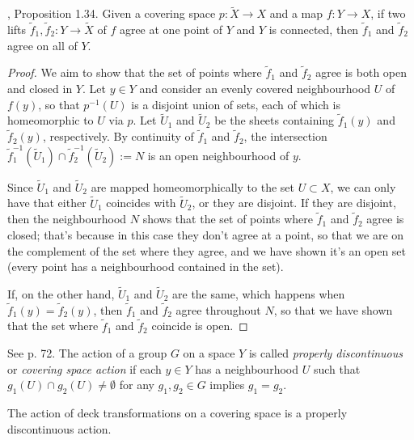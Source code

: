 \begin{proposition}
\label{proposition-unique-lifting-property}
\cite{hat}, Proposition 1.34. Given a
covering space $p:\tilde{X} \to X$ and a
map $f:Y \to X$, if two lifts
$\tilde{f}_1,\tilde{f}_2:Y \to \tilde{X}$ of
$f$
agree at one point of $Y$ and $Y$ is
connected, then $\tilde{f}_1$ and
$\tilde{f}_2$ agree on all of $Y$.
\end{proposition}

\begin{proof}
We aim to show that the set of points where
$\tilde{f}_1$ and $\tilde{f}_2$
agree is both open and closed in $Y$. Let $y
\in Y$ and consider an evenly
covered neighbourhood $U$ of $f(y)$, so that
$p^{-1}(U)$ is a disjoint union of
sets, each of which is homeomorphic to $U$
via $p$. Let $\tilde{U}_1$ and
$\tilde{U}_2$ be the sheets containing
$\tilde{f}_1(y)$ and $\tilde{f}_2(y)$,
respectively. By continuity of $\tilde{f}_1$
and $\tilde{f}_2$, the intersection
$\tilde{f}^{-1}_1(\tilde{U}_1) \cap
\tilde{f}_2^{-1}(\tilde{U}_2):=N$ is
 an open neighbourhood of $y$.

Since  $\tilde{U}_1$ and $\tilde{U}_2$ are
mapped homeomorphically to the set
$U \subset X$, we can only have that either
$\tilde{U}_1$ coincides
with $\tilde{U}_2$, or they are disjoint. If
they are disjoint, then the
neighbourhood $N$ shows that the set of
points where $\tilde{f}_1$ and
$\tilde{f}_2$ agree is closed; that's because
in this case they don't agree at a
point, so that we are on the complement of
the set where they agree, and we have
shown it's an open set (every point has a
neighbourhood contained in the set).

If, on the other hand, $\tilde{U}_1$ and
$\tilde{U}_2$ are the same, which
happens when $\tilde{f}_1(y)=\tilde{f}_2(y)$,
then $\tilde{f}_1$ and
$\tilde{f}_2$ agree throughout $N$, so that
we have shown that the set where
$\tilde{f}_1$ and $\tilde{f}_2$ coincide is
open.
\end{proof}

\begin{definition}
\label{definition-prope-disco-actio}
See \cite{hat} p. 72. The action of a group
$G$ on a space $Y$ is called
{\it properly discontinuous} or {\it covering
space action} if each $y \in Y$
has a neighbourhood $U$ such that $g_1(U)
\cap g_2(U)\neq \emptyset$ for any
$g_1,g_2 \in G$ implies $g_1=g_2$.
\end{definition}

\begin{proposition}
\label{proposition-deck-trans-act-prope}
The action of deck transformations on a
covering space is a properly
discontinuous action.
\end{proposition}

